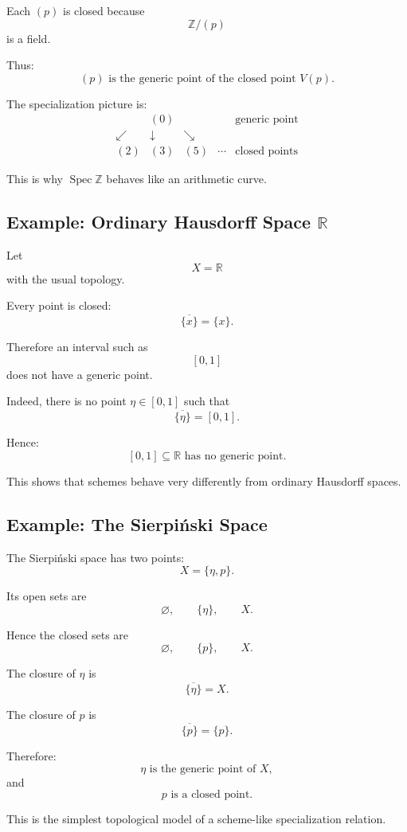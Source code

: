 \documentclass[12pt,a4paper]{article}
\theoremstyle{notespace}
\begin{document}
Each \((p)\) is closed because
\[
\mathbb Z/(p)
\]
is a field.

Thus:
\[
\boxed{
	(p)\text{ is the generic point of the closed point }V(p).
}
\]

The specialization picture is:
\[
\begin{array}{ccccc}
	& (0) & & & \text{generic point}
	\\[0.6em]
	\swarrow & \downarrow & \searrow
	\\[0.6em]
	(2) & (3) & (5) & \cdots & \text{closed points}
\end{array}
\]

This is why \(\operatorname{Spec}\mathbb Z\) behaves like an arithmetic curve.

\subsection{Example: Ordinary Hausdorff Space \(\mathbb R\)}

Let
\[
X=\mathbb R
\]
with the usual topology.

Every point is closed:
\[
\overline{\{x\}}=\{x\}.
\]

Therefore an interval such as
\[
[0,1]
\]
does not have a generic point.

Indeed, there is no point \(\eta\in [0,1]\) such that
\[
\overline{\{\eta\}}=[0,1].
\]

Hence:
\[
\boxed{
	[0,1]\subseteq \mathbb R\text{ has no generic point.}
}
\]

This shows that schemes behave very differently from ordinary Hausdorff spaces.

\subsection{Example: The Sierpiński Space}

The Sierpiński space has two points:
\[
X=\{\eta,p\}.
\]

Its open sets are
\[
\varnothing,\qquad \{\eta\},\qquad X.
\]

Hence the closed sets are
\[
\varnothing,\qquad \{p\},\qquad X.
\]

The closure of \(\eta\) is
\[
\overline{\{\eta\}}=X.
\]

The closure of \(p\) is
\[
\overline{\{p\}}=\{p\}.
\]

Therefore:
\[
\boxed{
	\eta\text{ is the generic point of }X,
}
\]
and
\[
\boxed{
	p\text{ is a closed point.}
}
\]

This is the simplest topological model of a scheme-like specialization relation.
\end{document}
